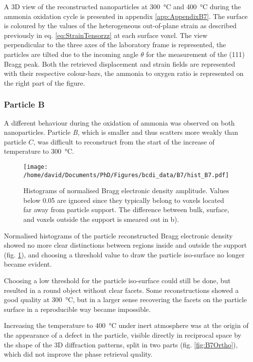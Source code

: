 A 3D view of the reconstructed nanoparticles at \qty{300}{\degreeCelsius} and \qty{400}{\degreeCelsius} during the ammonia oxidation cycle is presented in appendix \ref{app:AppendixB7}.
The surface is coloured by the values of the heterogeneous out-of-plane strain as described previously in eq. \ref{eq:StrainTensorzz} at each surface voxel.
The view perpendicular to the three axes of the laboratory frame is represented, the particles are tilted due to the incoming angle $\theta$ for the measurement of the (111) Bragg peak.
Both the retrieved displacement and strain fields are represented with their respective colour-bars, the ammonia to oxygen ratio is represented on the right part of the figure.

\subsubsection{Particle B}

A different behaviour during the oxidation of ammonia was observed on both nanoparticles.
Particle \textit{B}, which is smaller and thus scatters more weakly than particle $C$, was difficult to reconstruct from the start of the increase of temperature to \qty{300}{\degreeCelsius}.

\begin{figure}[!htb]
    \centering
    \texttt{[image: /home/david/Documents/PhD/Figures/bcdi\_data/B7/hist\_B7.pdf]}
    \caption{
        Histograms of normalised Bragg electronic density amplitude.
        Values below 0.05 are ignored since they typically belong to voxels located far away from particle support.
        The difference between bulk, surface, and voxels outside the support is smeared out in b).
    }
    \label{fig:B7Histo}
\end{figure}

Normalised histograms of the particle reconstructed Bragg electronic density showed no more clear distinctions between regions inside and outside the support (fig. \ref{fig:B7Histo}), and choosing a threshold value to draw the particle iso-surface no longer became evident.

Choosing a low threshold for the particle iso-surface could still be done, but resulted in a round object without clear facets.
Some reconstructions showed a good quality at \qty{300}{\degreeCelsius}, but in a larger sense recovering the facets on the particle surface in a reproducible way became impossible.

Increasing the temperature to \qty{400}{\degreeCelsius} under inert atmosphere was at the origin of the appearance of a defect in the particle, visible directly in reciprocal space by the shape of the 3D diffraction patterns, split in two parts (fig. \ref{fig:B7Ortho}), which did not improve the phase retrieval quality.

